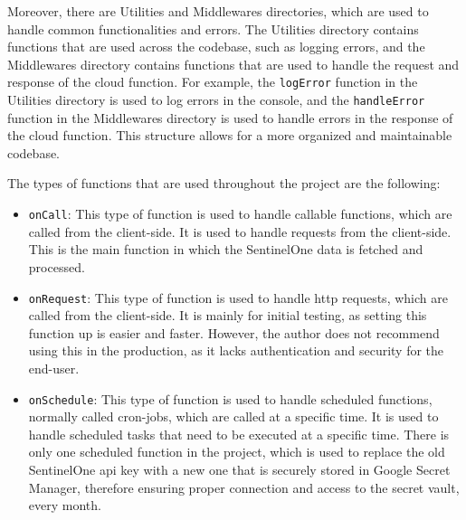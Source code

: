 \begin{multicols}{2}
  Moreover, there are Utilities and Middlewares directories, which are used to handle common functionalities and errors. The Utilities directory contains functions that
  are used across the codebase, such as logging errors, and the Middlewares directory contains functions that are used to handle the request and response of the
  cloud function. For example, the \texttt{logError} function in the Utilities directory is used to log errors in the console, and the \texttt{handleError} function in
  the Middlewares directory is used to handle errors in the response of the cloud function. This structure allows for a more organized and maintainable codebase.

  The types of functions that are used throughout the project are the following:
  \begin{itemize}
    \item \texttt{onCall}: This type of function is used to handle callable functions, which are called from the client-side. It is used to handle requests from the
          client-side. This is the main function in which the SentinelOne data is fetched and processed.
    \item \texttt{onRequest}: This type of function is used to handle \acrshort{http} requests, which are called from the client-side. It is mainly for initial testing, as
          setting this function up is easier and faster. However, the author does not recommend using this in the production, as it lacks authentication and security
          for the end-user.
    \item \texttt{onSchedule}: This type of function is used to handle scheduled functions, normally called cron-jobs, which are called at a specific time. It is used
          to handle scheduled tasks that need to be executed at a specific time. There is only one scheduled function in the project, which is used to replace the old
          SentinelOne \acrshort{api} key with a new one that is securely stored in Google Secret Manager, therefore ensuring proper connection and access to the secret
          vault, every month.
  \end{itemize}

\end{multicols}



